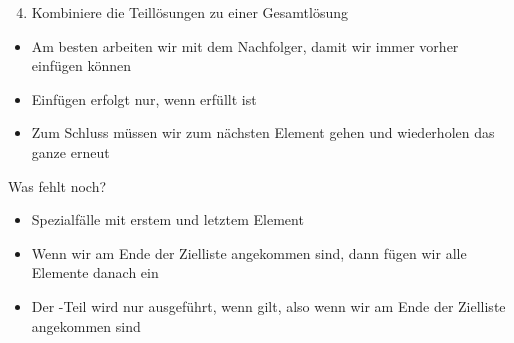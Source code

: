 \documentclass{../tuda-beamer}
\begin{document}
    \begin{frame}
        \begin{enumerate}
            \setcounter{enumi}{3}
            \item Kombiniere die Teillösungen zu einer Gesamtlösung
        \end{enumerate}

        \begin{itemize}
            \item Am besten arbeiten wir mit dem Nachfolger, damit wir immer vorher einfügen können
            \item Einfügen erfolgt nur, wenn  erfüllt ist
        \end{itemize}
    \end{frame}

    \begin{frame}
        
    \end{frame}

    \begin{frame}
        \begin{itemize}
            \item Zum Schluss müssen wir zum nächsten Element gehen und wiederholen das ganze erneut
        \end{itemize}

        
    \end{frame}

    \begin{frame}{Was fehlt noch?}
        \begin{itemize}
            \item Spezialfälle mit erstem und letztem Element
            \item Wenn wir am Ende der Zielliste angekommen sind, dann fügen wir alle Elemente
            danach ein
            \item Der -Teil wird nur ausgeführt, wenn  gilt, also wenn wir am Ende der Zielliste angekommen sind
        \end{itemize}

        
    \end{frame}

    \begin{frame}[allowframebreaks, c]
        
    \end{frame}
\end{document}
